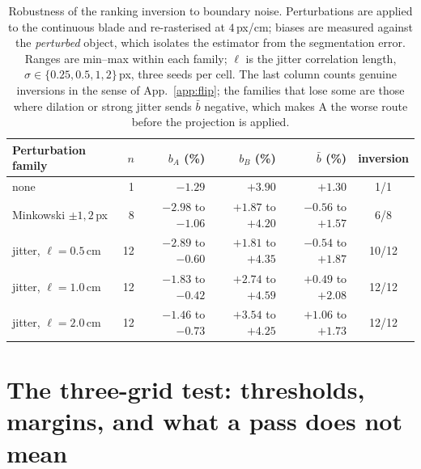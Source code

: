 \documentclass{article}
\begin{document}
\begin{table}[htbp]
\centering
\caption{Robustness of the ranking inversion to boundary noise. Perturbations are applied to the
continuous blade and re-rasterised at $4$\,px/cm; biases are measured against the \emph{perturbed}
object, which isolates the estimator from the segmentation error. Ranges are min--max within each
family; $\ell$ is the jitter correlation length, $\sigma \in \{0.25, 0.5, 1, 2\}$\,px, three seeds
per cell. The last column counts genuine inversions in the sense of App.~\ref{app:flip}; the
families that lose some are those where dilation or strong jitter sends $\bar b$ negative, which
makes A the worse route before the projection is applied.}
\label{tab:noise}
\small
\begin{tabular}{lrrrrc}
\toprule
Perturbation family & $n$ & $b_A$ (\%) & $b_B$ (\%) & $\bar b$ (\%) & inversion \\
\midrule
none                                & 1  & $-1.29$            & $+3.90$            & $+1.30$            & 1/1 \\
Minkowski $\pm 1, 2$\,px            & 8  & $-2.98$ to $-1.06$ & $+1.87$ to $+4.20$ & $-0.56$ to $+1.57$ & 6/8 \\
jitter, $\ell = 0.5$\,cm            & 12 & $-2.89$ to $-0.60$ & $+1.81$ to $+4.35$ & $-0.54$ to $+1.87$ & 10/12 \\
jitter, $\ell = 1.0$\,cm            & 12 & $-1.83$ to $-0.42$ & $+2.74$ to $+4.59$ & $+0.49$ to $+2.08$ & 12/12 \\
jitter, $\ell = 2.0$\,cm            & 12 & $-1.46$ to $-0.73$ & $+3.54$ to $+4.25$ & $+1.06$ to $+1.73$ & 12/12 \\
\bottomrule
\end{tabular}
\end{table}

\section{The three-grid test: thresholds, margins, and what a pass does not mean}
\label{app:thresholds}
\end{document}
